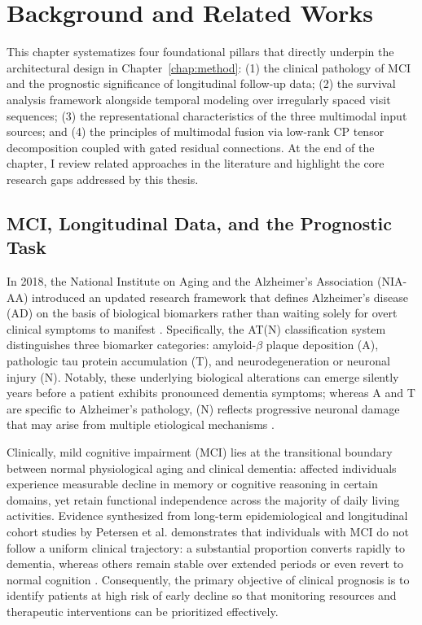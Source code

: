 \chapter{Background and Related Works}
\label{chap:background}

This chapter systematizes four foundational pillars that directly underpin the architectural design in Chapter~\ref{chap:method}: (1) the clinical pathology of MCI and the prognostic significance of longitudinal follow-up data; (2) the survival analysis framework alongside temporal modeling over irregularly spaced visit sequences; (3) the representational characteristics of the three multimodal input sources; and (4) the principles of multimodal fusion via low-rank CP tensor decomposition coupled with gated residual connections. At the end of the chapter, I review related approaches in the literature and highlight the core research gaps addressed by this thesis.

\section{MCI, Longitudinal Data, and the Prognostic Task}
In 2018, the National Institute on Aging and the Alzheimer's Association (NIA-AA) introduced an updated research framework that defines Alzheimer's disease (AD) on the basis of biological biomarkers rather than waiting solely for overt clinical symptoms to manifest \cite{jack2018niaaa}. Specifically, the AT(N) classification system distinguishes three biomarker categories: amyloid-$\beta$ plaque deposition (A), pathologic tau protein accumulation (T), and neurodegeneration or neuronal injury (N). Notably, these underlying biological alterations can emerge silently years before a patient exhibits pronounced dementia symptoms; whereas A and T are specific to Alzheimer's pathology, (N) reflects progressive neuronal damage that may arise from multiple etiological mechanisms \cite{jack2018niaaa}.

Clinically, mild cognitive impairment (MCI) lies at the transitional boundary between normal physiological aging and clinical dementia: affected individuals experience measurable decline in memory or cognitive reasoning in certain domains, yet retain functional independence across the majority of daily living activities. Evidence synthesized from long-term epidemiological and longitudinal cohort studies by Petersen et al. demonstrates that individuals with MCI do not follow a uniform clinical trajectory: a substantial proportion converts rapidly to dementia, whereas others remain stable over extended periods or even revert to normal cognition \cite{petersen2018mci}. Consequently, the primary objective of clinical prognosis is to identify patients at high risk of early decline so that monitoring resources and therapeutic interventions can be prioritized effectively.

